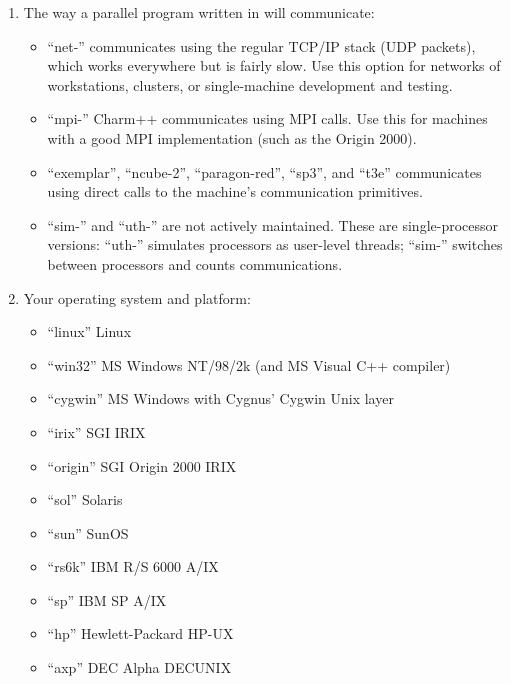 \documentclass[10pt]{article}
\begin{document}
\begin{enumerate}

\item The way a parallel program written in \ampi{} will communicate:

\begin{itemize}

\item ``net-'' \ampi{} communicates using the regular TCP/IP stack
(UDP packets), which works everywhere but is fairly slow.  Use this
option for networks of workstations, clusters, or single-machine 
development and testing.

\item ``mpi-'' Charm++ communicates using MPI calls.  Use this for
machines with a good MPI implementation (such as the Origin 2000).

\item ``exemplar'', ``ncube-2'', ``paragon-red'', ``sp3'', and ``t3e'' \ampi{} 
communicates using direct calls to the machine's communication primitives.

\item ``sim-'' and ``uth-'' are not actively maintained.  These are
single-processor versions: ``uth-'' simulates processors as user-level
threads; ``sim-'' switches between processors and counts communications.

\end{itemize}

\item  Your operating system and platform:

\begin{itemize}
\item ``linux''   Linux 
\item ``win32''   MS Windows NT/98/2k (and MS Visual C++ compiler)
\item ``cygwin''  MS Windows with Cygnus' Cygwin Unix layer
\item ``irix''    SGI IRIX
\item ``origin''  SGI Origin 2000 IRIX
\item ``sol''     Solaris
\item ``sun''     SunOS
\item ``rs6k''    IBM R/S 6000 A/IX 
\item ``sp''      IBM SP A/IX
\item ``hp''      Hewlett-Packard HP-UX
\item ``axp''     DEC Alpha DECUNIX
\end{itemize}


\end{enumerate}
\end{document}
